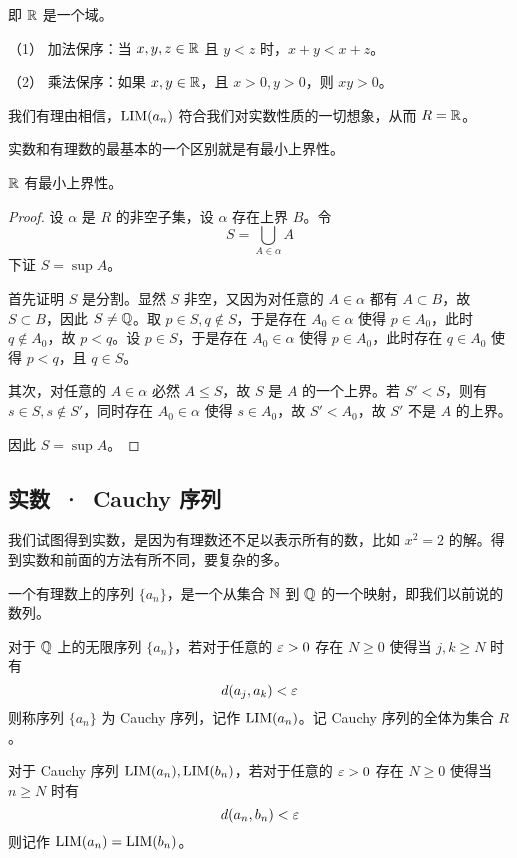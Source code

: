 即 $\RR$ 是一个域。

\begin{theorem}[$\RR$ 是有序域]
	（1） 加法保序：当 $x,y,z\in \mathbb{R}$ 且 $y<z$ 时，$x+y<x+z$。

	（2） 乘法保序：如果 $x,y\in \mathbb{R}$，且 $x>0,y>0$，则 $xy>0$。
\end{theorem}

我们有理由相信，$\operatorname{{LIM}}(a_n)$ 符合我们对实数性质的一切想象，从而 $R = \mathbb{R}$。

实数和有理数的最基本的一个区别就是有最小上界性。

\begin{theorem}
	$\RR$ 有最小上界性。
\end{theorem}
\begin{proof}
	设 $\alpha$ 是 $R$ 的非空子集，设 $\alpha$ 存在上界 $B$。令
	$$S = \bigcup_{A \in \alpha} A$$
	下证 $S = \sup A$。

	首先证明 $S$ 是分割。显然 $S$ 非空，又因为对任意的 $A\in \alpha$ 都有 $A \subset B$，故 $S \subset B$，因此 $S \ne \mathbb{Q}$。取 $p \in S,q\notin S$，于是存在 $A_0 \in \alpha$ 使得 $p \in A_0$，此时 $q \notin A_0$，故 $p<q$。设 $p \in S$，于是存在 $A_0 \in \alpha$ 使得 $p \in A_0$，此时存在 $q\in A_0$ 使得 $p < q$，且 $q \in S$。

	其次，对任意的 $A \in \alpha$ 必然 $A \leqslant S$，故 $S$ 是 $A$ 的一个上界。若 $S' < S$，则有 $s \in S, s \notin S'$，同时存在 $A_0 \in \alpha$ 使得 $s \in A_0$，故 $S' < A_0$，故 $S'$ 不是 $A$ 的上界。

	因此 $S = \sup A$。
\end{proof}

\subsection{实数\ ·\ Cauchy 序列}

我们试图得到实数，是因为有理数还不足以表示所有的数，比如 $x^2=2$ 的解。得到实数和前面的方法有所不同，要复杂的多。

一个有理数上的序列 $\{a_n\}$，是一个从集合 $\mathbb{N}$ 到 $\mathbb{Q}$ 的一个映射，即我们以前说的数列。

对于 $\mathbb{Q}$ 上的无限序列 $\{a_n\}$，若对于任意的 $\varepsilon > 0$ 存在 $N \geqslant 0$ 使得当 $j,k \geqslant N$ 时有 
$$d(a_j,a_k) < \varepsilon$$
则称序列 $\{a_n\}$ 为 Cauchy 序列，记作 $\operatorname{{LIM}}(a_n)$。记 Cauchy 序列的全体为集合 $R$。

对于 Cauchy 序列 $\operatorname{{LIM}}(a_n),\operatorname{{LIM}}(b_n)$，若对于任意的 $\varepsilon > 0$ 存在 $N \geqslant 0$ 使得当 $n \geqslant N$ 时有
$$d(a_n,b_n) < \varepsilon$$
则记作 $\operatorname{{LIM}}(a_n) = \operatorname{{LIM}}(b_n)$。

